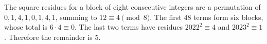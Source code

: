 The square residues for a block of eight consecutive integers are a permutation of $0,1,4,1,0,1,4,1$, summing to $12\equiv4\pmod8$. The first $48$ terms form six blocks, whose total is $6\cdot4\equiv0$. The last two terms have residues $2022^2\equiv4$ and $2023^2\equiv1$. Therefore the remainder is $\boxed5$.
